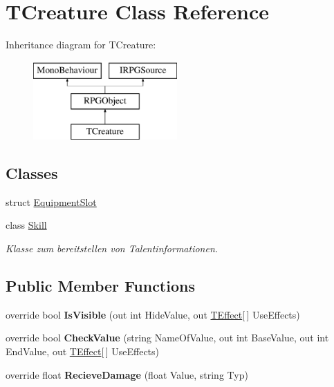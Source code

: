 \hypertarget{class_t_creature}{}\section{T\+Creature Class Reference}
\label{class_t_creature}
Inheritance diagram for T\+Creature\+:\begin{figure}[H]
\begin{center}
\leavevmode
\includegraphics[height=3.000000cm]{class_t_creature}
\end{center}
\end{figure}
\subsection*{Classes}
\begin{DoxyCompactItemize}
\item 
struct \hyperlink{struct_t_creature_1_1_equipment_slot}{Equipment\+Slot}
\item 
class \hyperlink{class_t_creature_1_1_skill}{Skill}
\begin{DoxyCompactList}\small\item\em Klasse zum bereitstellen von Talentinformationen. \end{DoxyCompactList}\end{DoxyCompactItemize}
\subsection*{Public Member Functions}
\begin{DoxyCompactItemize}
\item 
\hypertarget{class_t_creature_ab49e4ba9805e8ea34ed2992f5b9eb507}{}override bool {\bfseries Is\+Visible} (out int Hide\+Value, out \hyperlink{class_t_effect}{T\+Effect}\mbox{[}$\,$\mbox{]} Use\+Effects)\label{class_t_creature_ab49e4ba9805e8ea34ed2992f5b9eb507}

\item 
\hypertarget{class_t_creature_a721027f6e2ddb18cc24617da081d609b}{}override bool {\bfseries Check\+Value} (string Name\+Of\+Value, out int Base\+Value, out int End\+Value, out \hyperlink{class_t_effect}{T\+Effect}\mbox{[}$\,$\mbox{]} Use\+Effects)\label{class_t_creature_a721027f6e2ddb18cc24617da081d609b}

\item 
\hypertarget{class_t_creature_a875491187fd013158f76ac0f11de9506}{}override float {\bfseries Recieve\+Damage} (float Value, string Typ)\label{class_t_creature_a875491187fd013158f76ac0f11de9506}

\end{DoxyCompactItemize}
